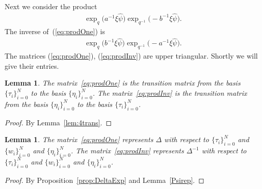 \documentclass[pdftex]{sigma}
\numberwithin{equation}{section}
\newtheorem{Lemma}[Theorem]{Lemma}
\begin{document}
Next we consider the product
\begin{gather}\label{eq:prodOne}
\exp_{q} \big(a^{-1} \xi \widehat \psi \big)
\exp_{q^{-1}} \big(-b^{-1} \xi \widehat \psi \big).
\end{gather}
The inverse of~(\ref{eq:prodOne}) is
\begin{gather}
\label{eq:prodInv}
\exp_{q} \bigl(b^{-1} \xi \widehat \psi \bigr)
\exp_{q^{-1}} \bigl(-a^{-1} \xi \widehat \psi \bigr).
\end{gather}
The matrices
(\ref{eq:prodOne}),
(\ref{eq:prodInv}) are upper triangular.
Shortly we will give their entries.

\begin{Lemma}\label{lem:doubletrans}
The matrix~\eqref{eq:prodOne} is the transition matrix from
the basis
$\lbrace \tau_i\rbrace_{i=0}^N$ to the basis
$\lbrace \eta_i\rbrace_{i=0}^N$.
The matrix~\eqref{eq:prodInv} is the transition matrix from
the basis
$\lbrace \eta_i\rbrace_{i=0}^N$ to the basis
$\lbrace \tau_i\rbrace_{i=0}^N$.
\end{Lemma}
\begin{proof}
By Lemma~\ref{lem:4trans}.
\end{proof}

\begin{Lemma} The matrix~\eqref{eq:prodOne} represents $\Delta$
with respect to
$\lbrace \tau_i \rbrace_{i=0}^N$ and
$\lbrace w_i \rbrace_{i=0}^N$ and
$\lbrace \eta_i \rbrace_{i=0}^N$.
The matrix~\eqref{eq:prodInv} represents $\Delta^{-1}$
with respect to
$\lbrace \tau_i \rbrace_{i=0}^N$ and
$\lbrace w_i \rbrace_{i=0}^N$ and
$\lbrace \eta_i \rbrace_{i=0}^N$.
\end{Lemma}
\begin{proof} By
Proposition~\ref{prop:DeltaExp}
and Lemma~\ref{Psirep}.
\end{proof}
\end{document}
